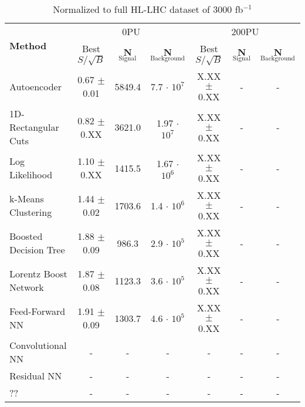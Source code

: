 \documentclass{article}
\begin{document}
\begin{table}[h!]
  \hskip-4.0cm
    \begin{tabular}{|l|c|c|c|c|c|c|} %
      \hline\hline
      \multirow{2}{*}{\textbf{Method}} & \multicolumn{3}{c|}{0PU} & \multicolumn{3}{c|}{200PU}\\
      \cline{2-7}
      & Best $S/\sqrt{B}$ & \textbf{N$_{\mathrm{Signal}}$} & \textbf{N$_{\mathrm{Background}}$} & Best $S/\sqrt{B}$ & \textbf{N$_{\mathrm{Signal}}$} & \textbf{N$_{\mathrm{Background}}$}\\
      \hline
      Autoencoder           & 0.67 $\pm$ 0.01 & 5849.4 & 7.7 $\cdot$ $10^7$ & X.XX $\pm$ 0.XX & - & - \\
      1D-Rectangular Cuts   & 0.82 $\pm$ 0.XX & 3621.0 & 1.97 $\cdot$ $10^7$ & X.XX $\pm$ 0.XX & - & -\\
      Log Likelihood        & 1.10 $\pm$ 0.XX & 1415.5 & 1.67 $\cdot$ $10^6$ & X.XX $\pm$ 0.XX & - & - \\
      k-Means Clustering    & 1.44 $\pm$ 0.02 & 1703.6 & 1.4 $\cdot$ $10^6$ & X.XX $\pm$ 0.XX & - & - \\
      Boosted Decision Tree & 1.88 $\pm$ 0.09 & 986.3  & 2.9 $\cdot$ $10^5$ & X.XX $\pm$ 0.XX & - & - \\
      Lorentz Boost Network & 1.87 $\pm$ 0.08 & 1123.3 & 3.6 $\cdot$ $10^5$ & X.XX $\pm$ 0.XX & - & - \\
      Feed-Forward NN       & 1.91 $\pm$ 0.09 & 1303.7 & 4.6 $\cdot$ $10^5$ & X.XX $\pm$ 0.XX & - & - \\
      Convolutional NN & - & - & - & - & - & - \\                          
      Residual NN & - & - & - & - & - & - \\
      ?? & - & - & - & - & - & - \\
      \hline\hline
    \end{tabular}
    \caption{Normalized to full HL-LHC dataset of 3000 fb$^{-1}$}
\end{table}
\end{document}
